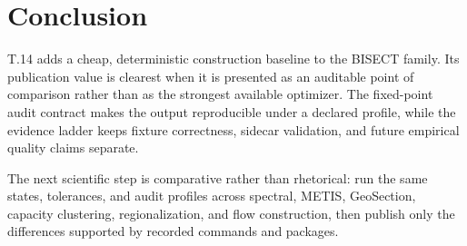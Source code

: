 \section{Conclusion}

T.14 adds a cheap, deterministic construction baseline to the BISECT family.
Its publication value is clearest when it is presented as an auditable point of
comparison rather than as the strongest available optimizer. The fixed-point
audit contract makes the output reproducible under a declared profile, while
the evidence ladder keeps fixture correctness, sidecar validation, and future
empirical quality claims separate.

The next scientific step is comparative rather than rhetorical: run the same
states, tolerances, and audit profiles across spectral, METIS, GeoSection,
capacity clustering, regionalization, and flow construction, then publish only
the differences supported by recorded commands and packages.
